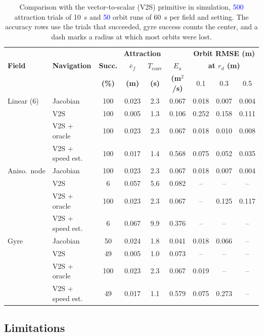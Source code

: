 \documentclass[lettersize,journal]{IEEEtran}
\newcommand{\rev}[1]{#1}
\newcommand{\newnum}[1]{\textcolor{blue}{#1}}
\begin{document}
\begin{table}[!t]
\centering
\scriptsize
\caption{Comparison with the vector-to-scalar (V2S) primitive in simulation, \newnum{500} attraction trials of 10~s and \newnum{50} orbit runs of 60~s per field and setting. The accuracy rows use the trials that succeeded, gyre success counts the center, and a dash marks a radius at which most orbits were lost.}
\label{tab:baselines}
\setlength{\tabcolsep}{1.8pt}
\rev{\begin{tabular}{ll|cccc|ccc}
\hline
 & & \multicolumn{4}{c|}{\textbf{Attraction}} & \multicolumn{3}{c}{\textbf{Orbit RMSE (m)}} \\
\textbf{Field} & \textbf{Navigation} & \textbf{Succ.} & \textbf{$\bar{e}_f$} & \textbf{$T_{\mathrm{conv}}$} & \textbf{$E_u$} & \multicolumn{3}{c}{\textbf{at $r_d$ (m)}} \\
 & & \textbf{(\%)} & \textbf{(m)} & \textbf{(s)} & \textbf{(m$^2$/s)} & 0.1 & 0.3 & 0.5 \\
\hline
Linear (6) & Jacobian & 100 & 0.023 & 2.3 & 0.067 & 0.018 & 0.007 & 0.004 \\
 & V2S & 100 & 0.005 & 1.3 & 0.106 & 0.252 & 0.158 & 0.111 \\
 & V2S + oracle & 100 & 0.023 & 2.3 & 0.067 & 0.018 & 0.010 & 0.008 \\
 & V2S + speed est. & 100 & 0.017 & 1.4 & 0.568 & 0.075 & 0.052 & 0.035 \\
\hline
Aniso.\ node & Jacobian & 100 & 0.023 & 2.3 & 0.067 & 0.018 & 0.007 & 0.004 \\
 & V2S & 6 & 0.057 & 5.6 & 0.082 & -- & -- & -- \\
 & V2S + oracle & 100 & 0.023 & 2.3 & 0.067 & -- & 0.125 & 0.117 \\
 & V2S + speed est. & 6 & 0.067 & 9.9 & 0.376 & -- & -- & -- \\
\hline
Gyre & Jacobian & 50 & 0.024 & 1.8 & 0.041 & 0.018 & 0.066 & -- \\
 & V2S & 49 & 0.005 & 1.0 & 0.073 & -- & -- & -- \\
 & V2S + oracle & 100 & 0.023 & 2.3 & 0.067 & 0.019 & -- & -- \\
 & V2S + speed est. & 49 & 0.017 & 1.1 & 0.579 & 0.075 & 0.273 & -- \\
\hline
\end{tabular}}
\end{table}

\subsection{Limitations}
\end{document}
